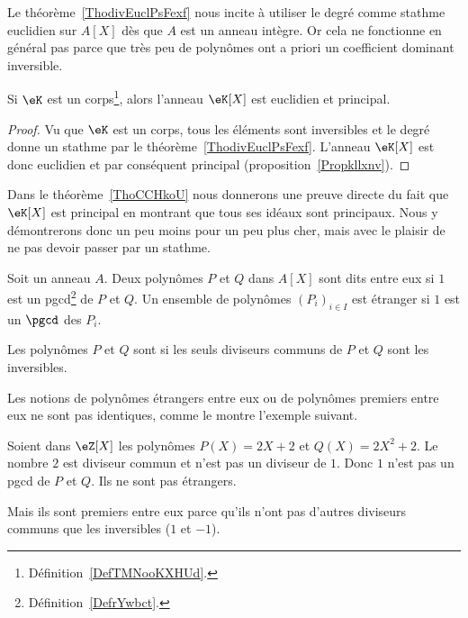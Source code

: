 \begin{normaltext}
    Le théorème~\ref{ThodivEuclPsFexf} nous incite à utiliser le degré comme stathme euclidien sur \( A[X]\) dès que \( A\) est un anneau intègre. Or cela ne fonctionne en général pas parce que très peu de polynômes ont a priori un coefficient dominant inversible.
\end{normaltext}

\begin{lemma}       \label{LEMooIDSKooQfkeKp}
    Si \( \eK\) est un corps\footnote{Définition~\ref{DefTMNooKXHUd}.}, alors l'anneau \( \eK[X]\) est euclidien et principal.
\end{lemma}

\begin{proof}
    Vu que \( \eK\) est un corps, tous les éléments sont inversibles et le degré donne un stathme par le théorème~\ref{ThodivEuclPsFexf}. L'anneau \( \eK[X]\) est donc euclidien et par conséquent principal (proposition~\ref{Propkllxnv}).
\end{proof}

Dans le théorème~\ref{ThoCCHkoU} nous donnerons une preuve directe du fait que \( \eK[X]\) est principal en montrant que tous ses idéaux sont principaux. Nous y démontrerons donc un peu moins pour un peu plus cher, mais avec le plaisir de ne pas devoir passer par un stathme.

\begin{definition}  \label{DefDSFooZVbNAX}
    Soit un anneau \( A\). Deux polynômes \( P\) et \( Q\) dans \( A[X]\) sont dits  entre eux si \( 1\) est un pgcd\footnote{Définition~\ref{DefrYwbct}.} de \( P\) et \( Q\). Un ensemble de polynômes \( (P_i)_{i\in I}\) est étranger  si \( 1\) est un \( \pgcd\) des \( P_i\).

Les polynômes \( P\) et \( Q\) sont  si les seuls diviseurs communs de \( P\) et \( Q\) sont les inversibles.
\end{definition}

Les notions de polynômes étrangers entre eux ou de polynômes premiers entre eux ne sont pas identiques, comme le montre l'exemple suivant.

\begin{example}
    Soient dans \( \eZ[X]\) les polynômes \( P(X)=2X+2\) et \( Q(X)=2X^2+2\). Le nombre \( 2\) est diviseur commun et n'est pas un diviseur de \( 1\). Donc \( 1\) n'est pas un pgcd de \( P\) et \( Q\). Ils ne sont pas étrangers.

    Mais ils sont premiers entre eux parce qu'ils n'ont pas d'autres diviseurs communs que les inversibles (\( 1\) et \( -1\)).
\end{example}

